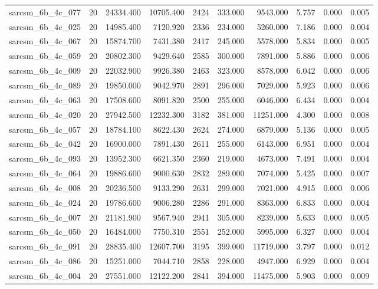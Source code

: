 \begin{tabular}{lrrrrrrrrr}
sarcsm\_6b\_4c\_077 & 20 & 24334.400 & 10705.400 & 2424 & 333.000 & 9543.000 & 5.757 & 0.000 & 0.005 \\
sarcsm\_6b\_4c\_025 & 20 & 14985.400 & 7120.920 & 2336 & 234.000 & 5260.000 & 7.186 & 0.000 & 0.004 \\
sarcsm\_6b\_4c\_067 & 20 & 15874.700 & 7431.380 & 2417 & 245.000 & 5578.000 & 5.834 & 0.000 & 0.005 \\
sarcsm\_6b\_4c\_059 & 20 & 20802.300 & 9429.640 & 2585 & 300.000 & 7891.000 & 5.886 & 0.000 & 0.006 \\
sarcsm\_6b\_4c\_009 & 20 & 22032.900 & 9926.380 & 2463 & 323.000 & 8578.000 & 6.042 & 0.000 & 0.006 \\
sarcsm\_6b\_4c\_089 & 20 & 19850.000 & 9042.970 & 2891 & 296.000 & 7029.000 & 5.923 & 0.000 & 0.006 \\
sarcsm\_6b\_4c\_063 & 20 & 17508.600 & 8091.820 & 2500 & 255.000 & 6046.000 & 6.434 & 0.000 & 0.004 \\
sarcsm\_6b\_4c\_020 & 20 & 27942.500 & 12232.300 & 3182 & 381.000 & 11251.000 & 4.300 & 0.000 & 0.008 \\
sarcsm\_6b\_4c\_057 & 20 & 18784.100 & 8622.430 & 2624 & 274.000 & 6879.000 & 5.136 & 0.000 & 0.005 \\
sarcsm\_6b\_4c\_042 & 20 & 16900.000 & 7891.430 & 2611 & 255.000 & 6143.000 & 6.951 & 0.000 & 0.004 \\
sarcsm\_6b\_4c\_093 & 20 & 13952.300 & 6621.350 & 2360 & 219.000 & 4673.000 & 7.491 & 0.000 & 0.004 \\
sarcsm\_6b\_4c\_064 & 20 & 19886.600 & 9000.630 & 2832 & 289.000 & 7074.000 & 5.425 & 0.000 & 0.007 \\
sarcsm\_6b\_4c\_008 & 20 & 20236.500 & 9133.290 & 2631 & 299.000 & 7021.000 & 4.915 & 0.000 & 0.006 \\
sarcsm\_6b\_4c\_024 & 20 & 19786.600 & 9006.280 & 2286 & 291.000 & 8363.000 & 6.833 & 0.000 & 0.004 \\
sarcsm\_6b\_4c\_007 & 20 & 21181.900 & 9567.940 & 2941 & 305.000 & 8239.000 & 5.633 & 0.000 & 0.005 \\
sarcsm\_6b\_4c\_050 & 20 & 16484.000 & 7750.310 & 2551 & 252.000 & 5995.000 & 6.327 & 0.000 & 0.004 \\
sarcsm\_6b\_4c\_091 & 20 & 28835.400 & 12607.700 & 3195 & 399.000 & 11719.000 & 3.797 & 0.000 & 0.012 \\
sarcsm\_6b\_4c\_086 & 20 & 15251.000 & 7044.710 & 2858 & 228.000 & 4947.000 & 6.929 & 0.000 & 0.004 \\
sarcsm\_6b\_4c\_004 & 20 & 27551.000 & 12122.200 & 2841 & 394.000 & 11475.000 & 5.903 & 0.000 & 0.009 \\

\end{tabular}
